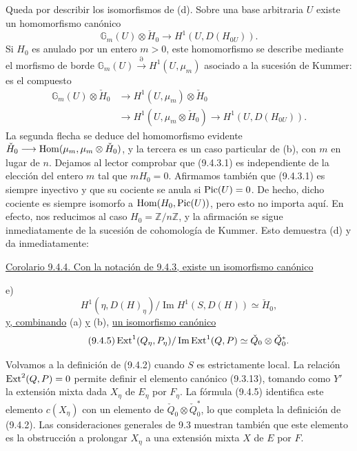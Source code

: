 
Queda por describir los isomorfismos de (d). Sobre una base arbitraria
$U$ existe un homomorfismo canónico
\begin{equation}\tag{9.4.3.1}
 \mathbb G_m(U)\otimes\check H_0
 \longrightarrow H^1(U,D(H_{0U})).
\end{equation}
Si $H_0$ es anulado por un entero $m>0$, este homomorfismo se describe
mediante el morfismo de borde
$\mathbb G_m(U)\xrightarrow{\partial}H^1(U,\mu_m)$ asociado a la
sucesión de Kummer: es el compuesto
\begin{equation*}
\begin{aligned}
 \mathbb G_m(U)\otimes\check H_0
 &\longrightarrow H^1(U,\mu_m)\otimes\check H_0\\
 &\longrightarrow H^1(U,\mu_m\otimes\check H_0)
  \longrightarrow H^1(U,D(H_{0U})).
\end{aligned}
\end{equation*}
La segunda flecha se deduce del homomorfismo evidente
$\check H_0\longrightarrow
\operatorname{Hom}(\mu_m,\mu_m\otimes\check H_0)$, y la tercera es un caso particular
de (b), con $m$ en lugar de $n$. Dejamos al lector comprobar que
(9.4.3.1) es independiente de la elección del entero $m$ tal que
$mH_0=0$. Afirmamos también que (9.4.3.1) es siempre inyectivo y que su
cociente se anula si $\operatorname{Pic}(U)=0$. De hecho, dicho cociente es siempre
isomorfo a $\operatorname{Hom}(H_0,\operatorname{Pic}(U))$, pero esto no importa aquí. En efecto, nos
reducimos al caso $H_0=\mathbb Z/n\mathbb Z$, y la afirmación se sigue
inmediatamente de la sucesión de cohomología de Kummer. Esto demuestra
(d) y da inmediatamente:

\medskip
\noindent
\underline{Corolario 9.4.4. Con la notación de 9.4.3, existe un
isomorfismo canónico}

\noindent
e)
\begin{equation*}\tag{e)}
 H^1(\eta,D(H)_\eta)/\operatorname{Im}H^1(S,D(H))
 \simeq\check H_0,
\end{equation*}
\underline{y, combinando} (a) \underline{y} (b), \underline{un isomorfismo canónico}
\begin{equation}\tag{9.4.5}
 \operatorname{Ext}^1(Q_\eta,P_\eta)/
 \operatorname{Im}\operatorname{Ext}^1(Q,P)
 \simeq\check Q_0\otimes\check Q_0^*.
\end{equation}


Volvamos a la definición de (9.4.2) cuando $S$ es estrictamente local.
La relación $\operatorname{Ext}^2(Q,P)=0$ permite definir el elemento canónico
(9.3.13), tomando como $Y'$ la extensión mixta dada $X_\eta$ de
$E_\eta$ por $F_\eta$. La fórmula (9.4.5) identifica este elemento
$c(X_\eta)$ con un elemento de $\check Q_0\otimes\check Q_0^*$, lo que
completa la definición de (9.4.2). Las consideraciones generales de 9.3
muestran también que este elemento es la obstrucción a prolongar
$X_\eta$ a una extensión mixta $X$ de $E$ por $F$.

